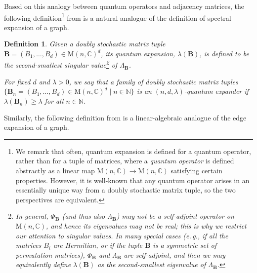 \documentclass[11pt]{article}
\newtheorem{definition}[theorem]{Definition}
\newcommand{\N}{{\mathbb N}}
\newcommand{\eg}{e.\,g.}
\theoremstyle{plain}
\numberwithin{equation}{section}
\theoremstyle{definition}
\newcommand{\bC}{\mathbb{C}}
\newcommand{\M}{\mathrm{M}}
\newcommand{\tuple}[1]{\mathbf{#1}}
\newcommand{\vB}{\tuple{B}}
\begin{document}
Based on this analogy between quantum operators and adjacency matrices, the following definition\footnote{We remark that often, quantum expansion is defined for a quantum operator, rather than for a tuple of matrices, where a \emph{quantum operator} is defined abstractly as a linear map $\M(n,\bC) \to \M(n,\bC)$ satisfying certain properties. However, it is well-known \cite[Theorem 8.2]{NC00} that any quantum operator arises in an essentially unique way from a doubly stochastic matrix tuple, so the two perspectives are equivalent.} from \cite{PhysRevA.76.032315,BT07} is a natural analogue of the definition of spectral expansion of a graph.
\begin{definition}
    Given a doubly stochastic matrix tuple $\vB=(B_1,\dots,B_d) \in \M(n,\bC)^d$, its \emph{quantum expansion}, $\lambda(\vB)$, is defined to be the second-smallest singular value\footnote{In general, $\Phi_\vB$ (and thus also $\Lambda_\vB$) may not be a self-adjoint operator on $\M(n,\bC)$, and hence its eigenvalues may not be real; this is why we restrict our attention to singular values. In many special cases (\eg, if all the matrices $B_i$ are Hermitian, or if the tuple $\vB$ is a symmetric set of permutation matrices), $\Phi_\vB$ and $\Lambda_\vB$ are self-adjoint, and then we may equivalently define $\lambda(\vB)$ as the second-smallest eigenvalue of $\Lambda_\vB$.} of $\Lambda_\vB$.

    For fixed $d$ and $\lambda>0$, we say that a family of doubly stochastic matrix tuples $\{\vB_n=(B_1, \dots, B_d)\in \M(n, \bC)^d\mid n\in \N\}$ is an \emph{$(n,d,\lambda)$-quantum expander} if $\lambda(\vB_n)\geq \lambda$ for all $n\in\N$. 
\end{definition}

Similarly, the following definition from \cite{PhysRevA.76.032315} is a linear-algebraic analogue of the edge expansion of a graph.
\end{document}
